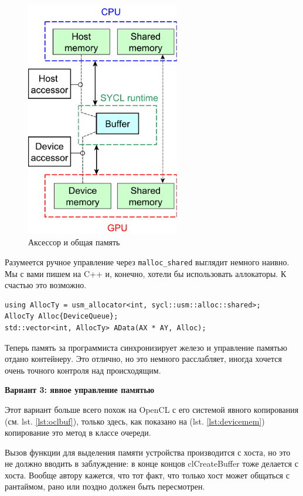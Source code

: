 \documentclass[a4paper,12pt,oneside]{article}
\begin{document}
\begin{figure}
\centering
\includegraphics[width=0.6\textwidth]{pictures/sycl-device-and-shared-mem-v.pdf}
\caption{Аксессор и общая память}
\label{fig:sharedmem}
\end{figure}

Разумеется ручное управление через \lstinline!malloc_shared! выглядит немного наивно.
Мы с вами пишем на C++ и, конечно, хотели бы использовать аллокаторы. К счастью это возможно.

\begin{lstlisting}[caption={Аллокатор в общей памяти},label={lst:sharedalloc}]
using AllocTy = usm_allocator<int, sycl::usm::alloc::shared>;
AllocTy Alloc{DeviceQueue};
std::vector<int, AllocTy> AData(AX * AY, Alloc);
\end{lstlisting}

Теперь память за программиста синхронизирует железо и управление памятью отдано контейнеру.
Это отлично, но это немного расслабляет, иногда хочется очень точного контроля над происходящим.

\textbf{Вариант 3: явное управление памятью}

Этот вариант больше всего похож на OpenCL с его системой явного копирования (см. lst. \ref{lst:oclbuf}), только здесь, как показано на (lst. \ref{lst:devicemem}) копирование это метод в классе очереди.

Вызов функции для выделения памяти устройства производится с хоста, но это не должно вводить в заблуждение: в конце концов clCreateBuffer тоже делается с хоста.
Вообще автору кажется, что тот факт, что только хост может общаться с рантаймом, рано или поздно должен быть пересмотрен.
\end{document}
